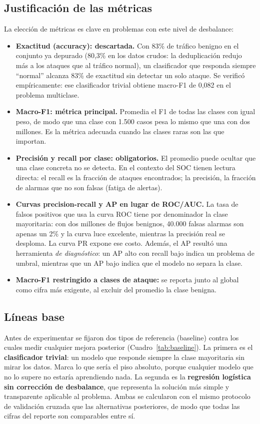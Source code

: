 \documentclass[11pt,a4paper]{article}
\begin{document}
\subsection{Justificación de las métricas}

La elección de métricas es clave en problemas con este nivel de desbalance:

\begin{itemize}
\item \textbf{Exactitud (accuracy): descartada.} Con 83\% de tráfico benigno
en el conjunto ya depurado (80,3\% en los datos crudos: la deduplicación
redujo más a los ataques que al tráfico normal), un clasificador que responda
siempre ``normal'' alcanza 83\% de exactitud sin
detectar un solo ataque. Se verificó empíricamente: ese clasificador trivial
obtiene macro-F1 de 0,082 en el problema multiclase.
\item \textbf{Macro-F1: métrica principal.} Promedia el F1 de todas las
clases con igual peso, de modo que una clase con 1.500 casos pesa lo mismo
que una con dos millones. Es la métrica adecuada cuando las clases raras son
las que importan.
\item \textbf{Precisión y recall por clase: obligatorios.} El promedio puede
ocultar que una clase concreta no se detecta. En el contexto del SOC tienen
lectura directa: el recall es la fracción de ataques encontrados; la
precisión, la fracción de alarmas que no son falsas (fatiga de alertas).
\item \textbf{Curvas precision-recall y AP en lugar de ROC/AUC.} La tasa de
falsos positivos que usa la curva ROC tiene por denominador la clase
mayoritaria: con dos millones de flujos benignos, 40.000 falsas alarmas son
apenas un 2\% y la curva luce excelente, mientras la precisión real se
desploma. La curva PR expone ese costo. Además, el AP resultó una herramienta
\emph{de diagnóstico}: un AP alto con recall bajo indica un problema de
umbral, mientras que un AP bajo indica que el modelo no separa la clase.
\item \textbf{Macro-F1 restringido a clases de ataque:} se reporta junto al
global como cifra más exigente, al excluir del promedio la clase benigna.
\end{itemize}

\subsection{Líneas base}

Antes de experimentar se fijaron dos tipos de referencia (baseline) contra los cuales
medir cualquier mejora posterior (Cuadro~\ref{tab:baseline}). La primera es el
\textbf{clasificador trivial}: un modelo que responde siempre la clase
mayoritaria sin mirar los datos. Marca lo que sería el piso absoluto, porque cualquier
modelo que no lo supere no estaría aprendiendo nada. La segunda es la
\textbf{regresión logística sin corrección de desbalance}, que representa la
solución más simple y transparente aplicable al problema. Ambas se calcularon
con el mismo protocolo de validación cruzada que las alternativas posteriores,
de modo que todas las cifras del reporte son comparables entre sí.
\end{document}
